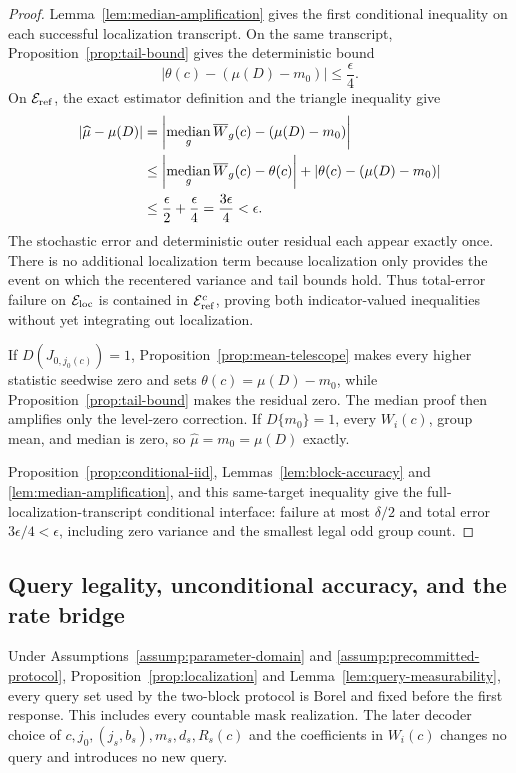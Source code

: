\begin{proof}
Lemma~\ref{lem:median-amplification} gives the first conditional inequality
on each successful localization transcript.  On the same transcript,
Proposition~\ref{prop:tail-bound} gives the deterministic bound
\[
 |\theta(c)-(\mu(D)-m_0)|\leq\frac\epsilon4.
\]
On $\mathcal E_{\rm ref}$, the exact estimator definition and the triangle
inequality give
\[
\begin{aligned}
 |\widehat\mu-\mu(D)|
 &=\left|\mathop{\rm median}_{g}\overline W_g(c)
 -(\mu(D)-m_0)\right|\\
 &\leq\left|\mathop{\rm median}_{g}\overline W_g(c)-\theta(c)\right|
 +|\theta(c)-(\mu(D)-m_0)|\\
 &\leq\frac\epsilon2+\frac\epsilon4
 =\frac{3\epsilon}{4}<\epsilon.
\end{aligned}
\]
The stochastic error and deterministic outer residual each appear exactly
once.  There is no additional localization term because localization only
provides the event on which the recentered variance and tail bounds hold.
Thus total-error failure on $\mathcal E_{\rm loc}$ is contained in
$\mathcal E_{\rm ref}^c$, proving both indicator-valued inequalities without
yet integrating out localization.

If $D(J_{0,j_0(c)})=1$, Proposition~\ref{prop:mean-telescope} makes every
higher statistic seedwise zero and sets $\theta(c)=\mu(D)-m_0$, while
Proposition~\ref{prop:tail-bound} makes the residual zero.  The median proof
then amplifies only the level-zero correction.  If $D\{m_0\}=1$, every
$W_i(c)$, group mean, and median is zero, so
$\widehat\mu=m_0=\mu(D)$ exactly.

Proposition~\ref{prop:conditional-iid}, Lemmas~\ref{lem:block-accuracy} and
\ref{lem:median-amplification}, and this same-target inequality give the
full-localization-transcript conditional interface: failure at most
$\delta/2$ and total error $3\epsilon/4<\epsilon$, including zero variance
and the smallest legal odd group count.
\end{proof}

\subsection{Query legality, unconditional accuracy, and the rate bridge}

\begin{proposition}
\label{prop:query-legality}
Under Assumptions~\ref{assump:parameter-domain} and
\ref{assump:precommitted-protocol}, Proposition~\ref{prop:localization} and
Lemma~\ref{lem:query-measurability}, every query set used by the two-block
protocol is Borel and fixed before the first response.  This includes every
countable mask realization.  The later decoder choice of
$c,j_0,(j_s,b_s),m_s,d_s,R_s(c)$ and the coefficients in $W_i(c)$ changes
no query and introduces no new query.
\end{proposition}

